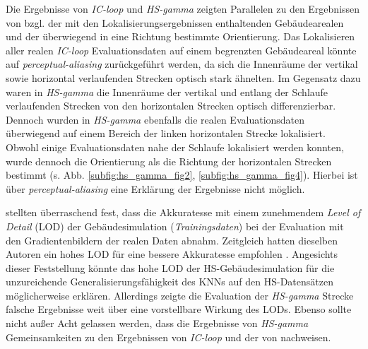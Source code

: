 Die Ergebnisse von \textit{IC-loop} und \textit{HS-gamma} zeigten Parallelen zu den Ergebnissen von \citet{acharyaBIMPoseNetIndoorCamera2019} bzgl. der mit den Lokalisierungsergebnissen enthaltenden Gebäudearealen und 
der überwiegend in eine Richtung bestimmte Orientierung.
Das Lokalisieren aller realen \textit{IC-loop} Evaluationsdaten auf einem begrenzten Gebäudeareal könnte auf \textit{perceptual-aliasing} zurückgeführt werden, da sich die Innenräume der vertikal sowie horizontal verlaufenden Strecken optisch stark ähnelten. Im Gegensatz dazu waren in \textit{HS-gamma} die Innenräume der vertikal und entlang der Schlaufe verlaufenden Strecken von den horizontalen Strecken optisch differenzierbar. Dennoch wurden in \textit{HS-gamma} ebenfalls die realen Evaluationsdaten überwiegend auf einem Bereich der linken horizontalen Strecke lokalisiert. Obwohl einige Evaluationsdaten nahe der Schlaufe lokalisiert werden konnten, wurde dennoch die Orientierung als die Richtung der horizontalen Strecken bestimmt (s. Abb. \ref{subfig:hs_gamma_fig2}, \ref{subfig:hs_gamma_fig4}). Hierbei ist über \textit{perceptual-aliasing} eine Erklärung der Ergebnisse nicht möglich.

\citet{acharyaBIMPoseNetIndoorCamera2019} stellten überraschend fest, dass die Akkuratesse mit einem zunehmendem \textit{Level of Detail} (LOD) der Gebäudesimulation (\textit{Trainingsdaten}) bei der Evaluation mit den Gradientenbildern der realen Daten abnahm. Zeitgleich hatten dieselben Autoren ein hohes LOD für eine bessere Akkuratesse empfohlen \cite{acharyaBIMPoseNetIndoorCamera2019}. Angesichts dieser Feststellung könnte das hohe LOD der HS-Gebäudesimulation für die unzureichende Generalisierungsfähigkeit des KNNs auf den HS-Datensätzen möglicherweise erklären. Allerdings zeigte die Evaluation der \textit{HS-gamma} Strecke falsche Ergebnisse weit über eine vorstellbare Wirkung des LODs. Ebenso sollte nicht außer Acht gelassen werden, dass die Ergebnisse von \textit{HS-gamma} Gemeinsamkeiten zu den Ergebnissen von \textit{IC-loop} und der von \citet{acharyaBIMPoseNetIndoorCamera2019} nachweisen.

